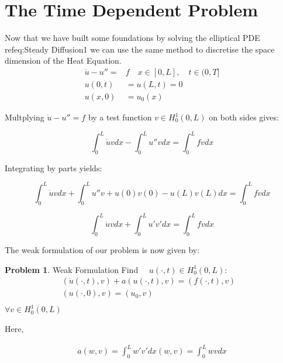 \documentclass{uonmathreport}
\theoremstyle{definition}
\theoremstyle{problem}
\newtheorem{problem}{Problem}[section]
\theoremstyle{theorem}
\begin{document}
\clearpage

\section{The Time Dependent Problem} \label{sec:Time dependent}

Now that we have built some foundations by solving the elliptical PDE ref{eq:Steady Diffusion1} we can use the same method to discretise the space dimension of the Heat Equation.
\begin{subequations} 
\begin{align}
  \dot{u} - u'' = & f \quad x \in [0, L], \quad t \in (0, T]  \\ \label{eq:Simple Heat}
  u(0, t) & = u(L, t) = 0\\
  u(x, 0) & = u_0(x)   
\end{align}
\end{subequations}

Multplying $\dot{u} - u'' = f$ by a test function  $v \in H^1_0(0, L)$  on both sides gives:

\begin{equation}
  \int_0^L \dot{u} v dx  - \int_0^L  u'' v  dx =   \int_0^L  f v  dx   
\end{equation}

Integrating by parts yields:

\begin{equation}
  \int_0^L \dot{u} v dx  + \int_0^L  u'' v  +u(0)v(0) - u(L)v(L) dx =   \int_0^L  f v  dx   
\end{equation}

\begin{equation}
  \int_0^L \dot{u} v dx +  \int_0^L  u' v'  dx =   \int_0^L  f v  dx    
\end{equation}

The weak formulation of our problem is now given by:

\begin{problem}{Weak Formulation} \label{weak2}
Find $\quad u(\cdot, t) \in H^1_0(0, L)$:
\begin{align*}
	(\dot{u}(\cdot, t), v) + a(u(\cdot, t), v) = (f(\cdot, t), v)&\\
	(u(\cdot, 0), v) = (u_0, v)&\\
\end{align*}
$\forall v \in H^1_0(0, L)$
\end{problem}

Here,

\begin{align*}
 a(w, v)  = \int_0^L  w' v'  dx 
 (w, v) = \int_0^L  w v  dx 
\end{align*}
\end{document}
